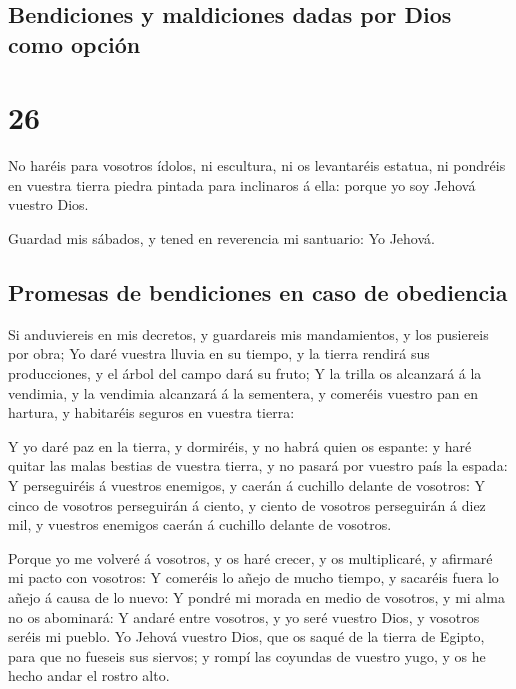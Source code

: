 \hypertarget{bendiciones-y-maldiciones-dadas-por-dios-como-opciuxf3n}{%
\subsection{Bendiciones y maldiciones dadas por Dios como
opción}\label{bendiciones-y-maldiciones-dadas-por-dios-como-opciuxf3n}}

\hypertarget{section-03-26}{%
\section{26}\label{section-03-26}}

 No haréis para vosotros ídolos, ni escultura, ni os
levantaréis estatua, ni pondréis en vuestra tierra piedra pintada para
inclinaros á ella: porque yo soy Jehová vuestro Dios.

 Guardad mis sábados, y tened en reverencia mi santuario:
Yo Jehová.

\hypertarget{promesas-de-bendiciones-en-caso-de-obediencia}{%
\subsection{Promesas de bendiciones en caso de
obediencia}\label{promesas-de-bendiciones-en-caso-de-obediencia}}

 Si anduviereis en mis decretos, y guardareis mis
mandamientos, y los pusiereis por obra;  Yo daré vuestra
lluvia en su tiempo, y la tierra rendirá sus producciones, y el árbol
del campo dará su fruto;  Y la trilla os alcanzará á la
vendimia, y la vendimia alcanzará á la sementera, y comeréis vuestro pan
en hartura, y habitaréis seguros en vuestra tierra:

 Y yo daré paz en la tierra, y dormiréis, y no habrá quien
os espante: y haré quitar las malas bestias de vuestra tierra, y no
pasará por vuestro país la espada:  Y perseguiréis á
vuestros enemigos, y caerán á cuchillo delante de vosotros:
 Y cinco de vosotros perseguirán á ciento, y ciento de
vosotros perseguirán á diez mil, y vuestros enemigos caerán á cuchillo
delante de vosotros.

 Porque yo me volveré á vosotros, y os haré crecer, y os
multiplicaré, y afirmaré mi pacto con vosotros:  Y
comeréis lo añejo de mucho tiempo, y sacaréis fuera lo añejo á causa de
lo nuevo:  Y pondré mi morada en medio de vosotros, y mi
alma no os abominará:  Y andaré entre vosotros, y yo seré
vuestro Dios, y vosotros seréis mi pueblo.  Yo Jehová
vuestro Dios, que os saqué de la tierra de Egipto, para que no fueseis
sus siervos; y rompí las coyundas de vuestro yugo, y os he hecho andar
el rostro alto.

